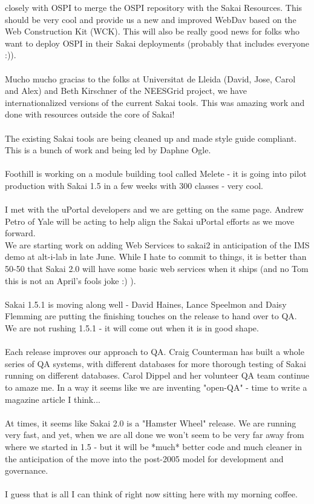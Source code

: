 \documentclass[12pt]{book}
\begin{document}
\begin{sf}
closely with OSPI to merge the OSPI repository
with the Sakai Resources.  This should be very cool and
provide us a new and improved WebDav based on
the Web Construction Kit (WCK).  This will also be
really good news for folks who want to deploy OSPI
in their Sakai deployments (probably that includes
everyone :)).\\
\\
Mucho mucho gracias to the folks at Universitat de
Lleida  (David, Jose, Carol and Alex) and Beth
Kirschner of the NEESGrid project, we have
internationalized versions of the current Sakai
tools.  This was amazing work and done with
resources outside the core of Sakai!\\
\\
The existing Sakai tools are being cleaned up and
made style guide compliant.  This is a bunch of
work and being led by Daphne Ogle.\\
\\
Foothill is working on a module building tool called
Melete - it is going into pilot production with Sakai
1.5 in a few weeks with 300 classes - very cool.\\
\\
I met with the uPortal developers and we are getting
on the same page.  Andrew Petro of Yale will be
acting to help align the Sakai uPortal efforts
as we move forward.\\

We are starting work on adding Web Services to sakai2
in anticipation of the IMS demo at alt-i-lab in late
June.  While I hate to commit to things, it is better
than 50-50 that Sakai 2.0 will have some basic web
services when it ships (and no Tom this is not an
April's fools joke :) ).\\
\\
Sakai 1.5.1 is moving along well - David Haines,
Lance Speelmon and Daisy Flemming are putting the
finishing touches on the release to hand over to
QA.  We are not rushing 1.5.1 - it will come out
when it is in good shape.\\
\\
Each release improves our approach to QA.  Craig
Counterman has built a whole series of QA systems,
with different databases for more thorough testing
of Sakai running on different databases.  Carol
Dippel and her volunteer QA team continue to amaze
me.  In a way it seems like we are inventing
"open-QA" - time to write a magazine article I think...\\
\\
At times, it seems like Sakai 2.0 is a "Hamster
Wheel" release.  We are running very fast, and
yet, when we are all done we won't seem to be very
far away from where we started in 1.5 - but it
will be *much* better code and much cleaner in
the anticipation of the move into the post-2005 model
for development and governance.\\
\\
I guess that is all I can think of right now sitting
here with my morning coffee.\\
\end{sf}
\end{document}
